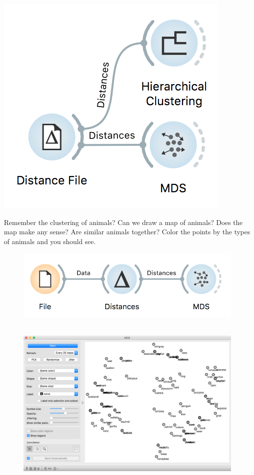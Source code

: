\begin{marginfigure}
    \includegraphics[width=\linewidth]{distance-workflow.png}
\end{marginfigure}

\newpage

Remember the clustering of animals? Can we draw a map of animals?
Does the map make any sense? Are similar animals together? Color the points by the types of animals and you should see.

\begin{figure}[h]
    \centering
    \includegraphics[scale=0.7]{zoo-workflow.png}
    \caption{$\;$}
\end{figure}

\begin{figure}[h]
    \centering
    \includegraphics[width=\linewidth]{zoo-mds.png}
    \caption{$\;$}
\end{figure}

